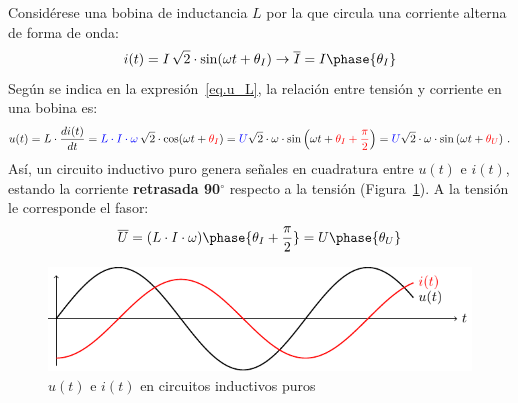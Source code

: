 \documentclass[11pt]{book} %
\numberwithin{dummy}{section}
\theoremstyle{ocrenumbox}
\theoremstyle{blacknumex}
\theoremstyle{blacknumbox}
\theoremstyle{ocrenum}
\newlength\esp
\begin{document}
	Considérese una bobina de inductancia $L$ por la que circula una corriente alterna de forma de onda:
	\begin{equation*}
		i(t)=I\,\sqrt{2}\cdot\sin(\omega t+\theta_I)\rightarrow\overline{I}=I\phase{\theta_I}
	\end{equation*}
	Según se indica en la expresión~\eqref{eq.u_L}, la relación entre tensión y corriente en una bobina es: 
	\begin{equation*}
		u(t)=L\cdot\dfrac{di(t)}{dt}={\color{blue}L\cdot I \cdot \omega}\,\sqrt{2}\cdot  \cos(\omega t+{\color{red}\theta_I})= {\color{blue} U} \sqrt{2}\cdot \omega\cdot  \sin \left(\omega t+{\color{red}\theta_I+\frac{\pi}{2}}\right)= {\color{blue} U} \sqrt{2}\cdot \omega\cdot  \sin \left(\omega t+{\color{red}\theta_U}\right)\,.
	\end{equation*}
	Así, un circuito inductivo puro genera señales en cuadratura entre $u(t)$ e $i(t)$, estando la corriente \textbf{retrasada 90$^\circ$} respecto a la tensión (Figura~\ref{fig.inductivoPuro}). A la tensión le corresponde el fasor:
	\begin{equation*}
		\overline{U}=(L\cdot I\cdot\omega)\phase{\theta_I+\frac{\pi}{2}}=U\phase{\theta_U}
	\end{equation*}
	\begin{figure}[htbp]
		\centering
		\includegraphics{../figs/inductivoPuro.pdf}
		\caption{$u(t)$ e $i(t)$ en circuitos inductivos puros}
		\label{fig.inductivoPuro}
	\end{figure}
	
\end{document}
